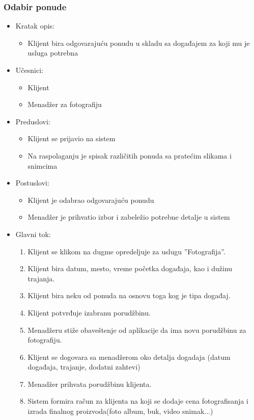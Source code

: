 \documentclass[a4paper]{article}
\begin{document}
\subsubsection{Odabir ponude}
\begin{itemize}
    \item Kratak opis: 
    \begin{itemize}
        \item Klijent bira odgovarajuću ponudu u skladu sa događajem za koji mu je usluga potrebna
    \end{itemize}
    \item Učesnici:
        \begin{itemize}
        \item Klijent
        \item Menadžer za fotografiju
    \end{itemize}
    \item Preduslovi:
        \begin{itemize}
            \item Klijent se prijavio na sistem
            \item Na raspolaganju je spisak različitih ponuda sa pratećim slikama i snimcima
        \end{itemize}
    \item Postuslovi:
        \begin{itemize}
            \item Klijent je odabrao odgovarajuću ponudu
            \item Menadžer je prihvatio izbor i zabeležio potrebne detalje u sistem
        \end{itemize}
    \item Glavni tok:
        \begin{enumerate}
            \item Klijent se klikom na dugme opredeljuje za uslugu ''Fotografija''.
            \item Klijent bira datum, mesto, vreme početka događaja, kao i dužinu trajanja.
            \item Klijent bira neku od ponuda na osnovu toga kog je tipa događaj.
            \item Klijent potvrđuje izabranu porudžbinu.
            \item Menadžeru stiže obaveštenje od aplikacije da ima novu porudžbinu za fotografiju.
            \item Klijent se dogovara sa menadžerom oko detalja dogadaja (datum događaja, trajanje, dodatni zahtevi)
            \item Menadžer prihvata porudžbinu klijenta.
            \item Sistem formira račun za klijenta na koji se dodaje cena fotografisanja i izrada finalnog proizvoda(foto album, buk, video snimak...)
        \end{enumerate}
        

\end{itemize}
\end{document}
